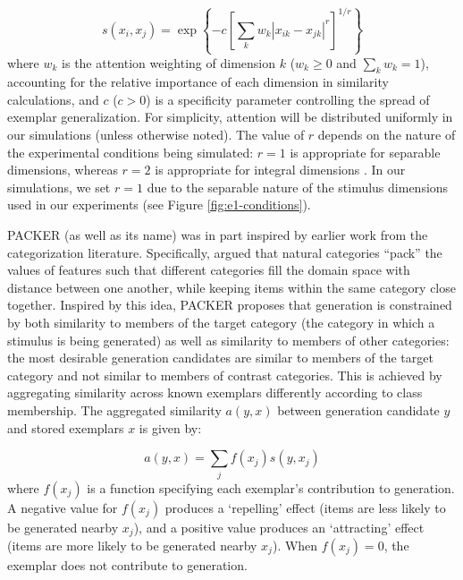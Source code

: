\documentclass[12pt]{article}
\begin{document}
\begin{flushleft}
\begin{equation} s\left(x_i,x_j\right) = \exp \left\{ -c \left[\sum_{k}{ w_k
\left| x_{ik} - x_{jk} \right|^r }\right]^{1/r} \right\}
\label{eq:similarity}
\end{equation}
% 
where $w_k$ is the attention weighting of dimension $k$ ($w_k \geq 0$ and
$\sum_k{w_k} = 1$), accounting for the relative importance of each dimension in
similarity calculations, and $c$ ($c>0$) is a specificity parameter controlling
the spread of exemplar generalization. For simplicity, attention will be
distributed uniformly in our simulations (unless otherwise noted). The value of
$r$ depends on the nature of the experimental conditions being simulated: $r=1$
is appropriate for separable dimensions, whereas $r=2$ is appropriate for
integral dimensions \citep[e.g.,][]{shepard1964attention,garner1974processing}.
In our simulations, we set $r=1$ due to the separable nature of the stimulus
dimensions used in our experiments (see Figure \ref{fig:e1-conditions}).

PACKER (as well as its name) was in part inspired by earlier work from the
categorization literature. Specifically, \cite{hidaka2011packing} argued that
natural categories ``pack'' the values of features such that different
categories fill the domain space with distance between one another, while
keeping items within the same category close together. Inspired by this idea,
PACKER proposes that generation is constrained by both similarity to members of
the target category (the category in which a stimulus is being generated) as
well as similarity to members of other categories: the most desirable generation
candidates are similar to members of the target category and not similar to
members of contrast categories. This is achieved by aggregating similarity
across known exemplars differently according to class membership. The aggregated
similarity $a(y,x)$ between generation candidate $y$ and stored exemplars $x$ is
given by:

\begin{equation} a(y, x) = \sum_j{f(x_j) s(y, x_j)}
\end{equation}
% 
where $f(x_j)$ is a function specifying each exemplar's contribution to
generation. A negative value for $f(x_j)$ produces a `repelling' effect (items
are less likely to be generated nearby $x_j$), and a positive value produces an
`attracting' effect (items are more likely to be generated nearby $x_j$). When
$f(x_j)=0$, the exemplar does not contribute to generation.


\end{flushleft}
\end{document}
